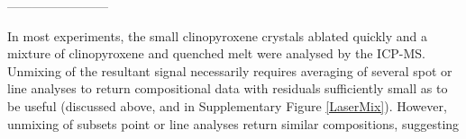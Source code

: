	
	
	



------------------------



In most experiments, the small clinopyroxene crystals ablated quickly and a mixture of clinopyroxene and quenched melt were analysed by the ICP-MS. Unmixing of the resultant signal necessarily requires averaging of several spot or line analyses to return compositional data with residuals sufficiently small as to be useful (discussed above, and in Supplementary Figure \ref{LaserMix}). However, unmixing of subsets point or line analyses return similar compositions, suggesting



